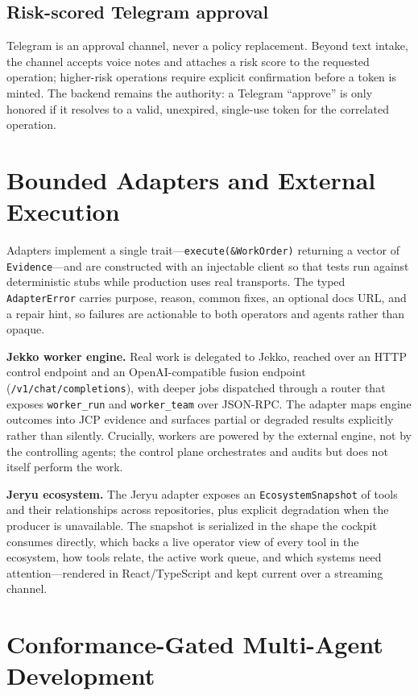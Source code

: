 \documentclass[conference]{IEEEtran}
\begin{document}
\subsection{Risk-scored Telegram approval}
Telegram is an approval channel, never a policy replacement. Beyond text
intake, the channel accepts voice notes and attaches a risk score to the
requested operation; higher-risk operations require explicit confirmation
before a token is minted. The backend remains the authority: a Telegram
``approve'' is only honored if it resolves to a valid, unexpired, single-use
token for the correlated operation.

\section{Bounded Adapters and External Execution}
\label{sec:adapters}

Adapters implement a single trait---\texttt{execute(\&WorkOrder)} returning a
vector of \texttt{Evidence}---and are constructed with an injectable client so
that tests run against deterministic stubs while production uses real
transports. The typed \texttt{AdapterError} carries purpose, reason,
common fixes, an optional docs URL, and a repair hint, so failures are
actionable to both operators and agents rather than opaque.

\textbf{Jekko worker engine.} Real work is delegated to Jekko, reached over an
HTTP control endpoint and an OpenAI-compatible fusion endpoint
(\texttt{/v1/chat/completions}), with deeper jobs dispatched through a router
that exposes \texttt{worker\_run} and \texttt{worker\_team} over JSON-RPC. The
adapter maps engine outcomes into JCP evidence and surfaces partial or degraded
results explicitly rather than silently. Crucially, workers are powered by the
external engine, not by the controlling agents; the control plane orchestrates
and audits but does not itself perform the work.

\textbf{Jeryu ecosystem.} The Jeryu adapter exposes an
\texttt{EcosystemSnapshot} of tools and their relationships across repositories,
plus explicit degradation when the producer is unavailable. The snapshot is
serialized in the shape the cockpit consumes directly, which backs a live
operator view of every tool in the ecosystem, how tools relate, the active work
queue, and which systems need attention---rendered in React/TypeScript and kept
current over a streaming channel.

\section{Conformance-Gated Multi-Agent Development}
\label{sec:ratchet}
\end{document}

